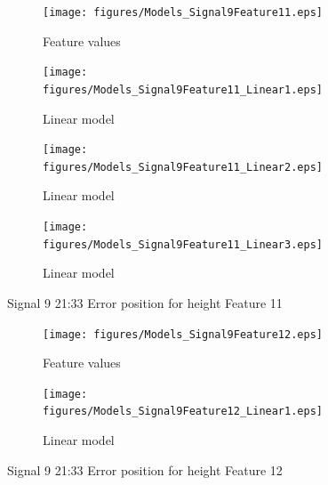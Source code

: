\documentclass[]{article}
\begin{document}
\begin{figure}[H]
	\captionsetup[subfigure]{justification=Centering}
    \centering
		\begin{subfigure}{.45\textwidth}
		  \centering
    			\texttt{[image: figures/Models\_Signal9Feature11.eps]}
		  	\caption{Feature values}
		  	\label{fig:Models_Signal9Feature11}
		\end{subfigure}\hspace{\fill} %
		\begin{subfigure}{.45\textwidth}
		  \centering
 		   	\texttt{[image: figures/Models\_Signal9Feature11\_Linear1.eps]}
		  	\caption{Linear model}
		  	\label{fig:Models_Signal9Feature11_Linear1}
		\end{subfigure}
		\bigskip
		\begin{subfigure}{.45\textwidth}
		  \centering
    			\texttt{[image: figures/Models\_Signal9Feature11\_Linear2.eps]}
		  	\caption{Linear model}
		  	\label{fig:Models_Signal9Feature11_Linear2}
		\end{subfigure}\hspace{\fill} %
		\begin{subfigure}{.45\textwidth}
		  \centering
 		   	\texttt{[image: figures/Models\_Signal9Feature11\_Linear3.eps]}
		  	\caption{Linear model}
		  	\label{fig:Models_Signal9Feature11_Linear3}
		\end{subfigure}
    \caption{Signal 9 21:33 Error position for height Feature 11}
    \label{fig:Models_Signal9Feature11_Caption}
\end{figure}



\begin{figure}[H]
    \centering
		\begin{subfigure}{.5\textwidth}
		  \centering
    			\texttt{[image: figures/Models\_Signal9Feature12.eps]}
		  	\caption{Feature values}
		  	\label{fig:Models_Signal9Feature12}
		\end{subfigure}%
		\begin{subfigure}{.5\textwidth}
		  \centering
 		   	\texttt{[image: figures/Models\_Signal9Feature12\_Linear1.eps]}
		  	\caption{Linear model}
		  	\label{fig:Models_Signal9Feature12_Linear1}
		\end{subfigure}
    \caption{Signal 9 21:33 Error position for height Feature 12}
    \label{fig:Models_Signal9Feature12_Caption}
\end{figure}
\end{document}

